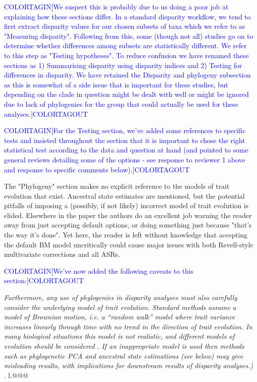 \documentclass[12pt,letterpaper]{article}
\begin{document}
\textcolor{blue}{COLORTAGIN[We suspect this is probably due to us doing a poor job at explaining how these sections differ. In a standard disparity workflow, we tend to first extract disparity values for our chosen subsets of taxa which we refer to as "Measuring disparity". Following from this, some (though not all) studies go on to determine whether differences among subsets are statistically different. We refer to this step as "Testing hypotheses". To reduce confusion we have renamed these sections as 1) Summarising disparity using disparity indices and 2) Testing for differences in disparity. We have retained the Disparity and phylogeny subsection as this is somewhat of a side issue that is important for these studies, but depending on the clade in question might be dealt with well or might be ignored due to lack of phylogenies for the group that could actually be used for these analyses.]COLORTAGOUT}

\textcolor{blue}{COLORTAGIN[For the Testing section, we've added some references to specific tests and insisted throughout the section that it is important to chose the right statistical test according to the data and question at hand (and pointed to some general reviews detailing some of the options - see response to reviewer 1 above and response to specific comments below).]COLORTAGOUT}

\noindent The "Phylogeny" section makes no explicit reference to the models of trait evolution that exist. Ancestral state estimates are mentioned, but the potential pitfalls of imposing a (possibly, if not likely) incorrect model of trait evolution is elided. Elsewhere in the paper the authors do an excellent job warning the reader away from just accepting default options, or doing something just because "that's the way it's done". Yet here, the reader is left without knowledge that accepting the default BM model uncritically could cause major issues with both Revell-style multivariate corrections and all ASRs.

\textcolor{blue}{COLORTAGIN[We've now added the following caveats to this section:]COLORTAGOUT}

\textit{Furthermore, any use of phylogenies in disparity analyses must also carefully consider the underlying model of trait evolution. Standard methods assume a model of Brownian motion, i.e. a ``random walk'' model where trait variance increases linearly through time with no trend in the direction of trait evolution. In many biological situations this model is not realistic, and different models of evolution should be considered \citealt{blomberg2020}. If an inappropriate model is used then methods such as phylogenetic PCA and ancestral state estimations (see below) may give misleading results, with implications for downstream results of disparity analyses.)} . l.@@@
\end{document}
